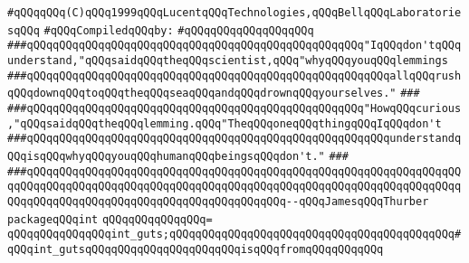 \label{src/lib/std/int.pkg}
\verb|#qQQqqQQq(C)qQQq1999qQQqLucentqQQqTechnologies,qQQqBellqQQqLaboratoriesqQQq|\newline
\newline
\verb|#qQQqCompiledqQQqby:|\newline
\verb|#qQQqqQQqqQQqqQQqqQQq|\newline
\newline
\newline
\newline
\verb|###qQQqqQQqqQQqqQQqqQQqqQQqqQQqqQQqqQQqqQQqqQQqqQQqqQQq"IqQQqdon'tqQQqunderstand,"qQQqsaidqQQqtheqQQqscientist,qQQq"whyqQQqyouqQQqlemmings|\newline
\verb|###qQQqqQQqqQQqqQQqqQQqqQQqqQQqqQQqqQQqqQQqqQQqqQQqqQQqqQQqallqQQqrushqQQqdownqQQqtoqQQqtheqQQqseaqQQqandqQQqdrownqQQqyourselves."|\newline
\verb|###|\newline
\verb|###qQQqqQQqqQQqqQQqqQQqqQQqqQQqqQQqqQQqqQQqqQQqqQQqqQQq"HowqQQqcurious,"qQQqsaidqQQqtheqQQqlemming.qQQq"TheqQQqoneqQQqthingqQQqIqQQqdon't|\newline
\verb|###qQQqqQQqqQQqqQQqqQQqqQQqqQQqqQQqqQQqqQQqqQQqqQQqqQQqqQQqunderstandqQQqisqQQqwhyqQQqyouqQQqhumanqQQqbeingsqQQqdon't."|\newline
\verb|###|\newline
\verb|###qQQqqQQqqQQqqQQqqQQqqQQqqQQqqQQqqQQqqQQqqQQqqQQqqQQqqQQqqQQqqQQqqQQqqQQqqQQqqQQqqQQqqQQqqQQqqQQqqQQqqQQqqQQqqQQqqQQqqQQqqQQqqQQqqQQqqQQqqQQqqQQqqQQqqQQqqQQqqQQqqQQqqQQqqQQqqQQqqQQq--qQQqJamesqQQqThurber|\newline
\newline
\newline
\newline
\verb|packageqQQqint|\newline
\verb|qQQqqQQqqQQqqQQq=|\newline
\verb|qQQqqQQqqQQqqQQqint_guts;qQQqqQQqqQQqqQQqqQQqqQQqqQQqqQQqqQQqqQQqqQQq#qQQqint_gutsqQQqqQQqqQQqqQQqqQQqqQQqisqQQqfromqQQqqQQqqQQq|\newline

